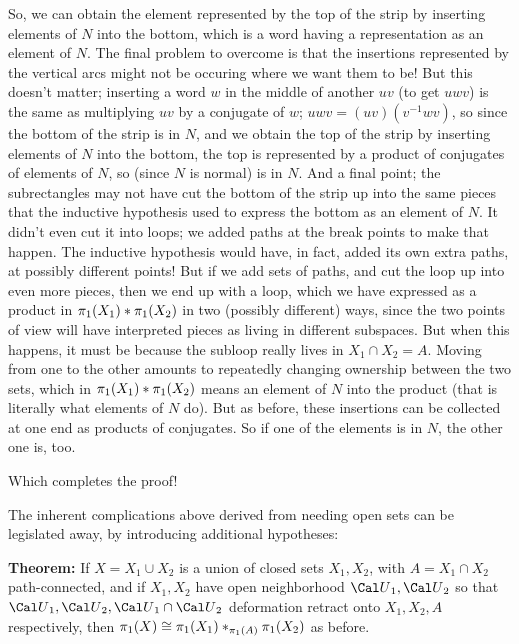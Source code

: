 \msk




\leavevmode


\epsfxsize=3.5in

\bsk

So, we can obtain the element represented by the top of the strip by 
inserting elements of $N$ into the bottom, which 
is a word having a representation as an 
element of $N$. The final problem to overcome is that the
insertions represented by the vertical arcs might not be occuring
where we want them to be! But this doesn't matter; inserting a word $w$
in the middle of another $uv$ (to get $uwv$) 
is the same as multiplying $uv$ by a conjugate of $w$;
$uwv = (uv)(v^{-1}wv)$, so since the bottom of the strip is 
in $N$, and we obtain the top of the strip by inserting elements
of $N$ into the bottom, the top is represented by a product of 
conjugates of elements of $N$, so (since $N$ is normal) is in $N$.
And a  final point; the subrectangles may not have 
cut the bottom of the strip up into the same pieces that the inductive
hypothesis used to express the bottom as an element of $N$. It didn't even 
cut it into loops; we added paths at the break points to make that happen.
The inductive hypothesis would have, in fact, added its own extra paths,
at possibly different points!
But if we add  sets of paths, 
and cut the loop up into even more pieces, 
then we end up with a loop, which we have expressed as a product in
$\pi_1(X_1)*\pi_1(X_2)$ in two (possibly different) ways, since the 
two points of view will have interpreted pieces as living in 
different subspaces. But when this happens, it must be because
the subloop really lives in $X_1\cap X_2=A$. Moving from one
to the other amounts to repeatedly changing ownership between the 
two sets, which in $\pi_1(X_1)*\pi_1(X_2)$ means 
an element of $N$ into the product (that is literally what elements
of $N$ do). But as before, these insertions can be collected at one
end as products of conjugates. So if one of the elements is in $N$, 
the other one is, too.

\msk

Which completes the proof! 

\bsk


The inherent complications above derived from needing open
sets can be legislated away, by introducing additional
hypotheses:

\msk

{\bf Theorem:} If $X=X_1\cup X_2$ is a union of closed
sets $X_1,X_2$, with $A=X_1\cap X_2$ path-connected, 
and if $X_1,X_2$ have open neighborhood ${\Cal U}_1,{\Cal U}_2$
so that ${\Cal U}_1,{\Cal U}_2,{\Cal U}_1\cap{\Cal U}_2$
deformation retract onto $X_1,X_2,A$ respectively, then 
$\pi_1(X)\cong \pi_1(X_1)*_{\pi_1(A)}\pi_1(X_2)$ as before.

